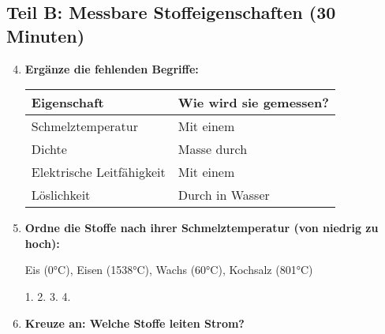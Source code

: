 \subsection*{Teil B: Messbare Stoffeigenschaften (30 Minuten)}

\begin{enumerate}[label=\arabic*.]
    \setcounter{enumi}{3}

    \item \textbf{Ergänze die fehlenden Begriffe:}
    \vspace{0.5cm}

    \begin{tabular}{|p{6cm}|p{8cm}|}
        \hline
        \textbf{Eigenschaft} & \textbf{Wie wird sie gemessen?} \\
        \hline
        Schmelztemperatur & Mit einem \underline{\hspace{3cm}} \\
        \hline
        Dichte & Masse durch \underline{\hspace{3cm}} \\
        \hline
        Elektrische Leitfähigkeit & Mit einem \underline{\hspace{3cm}} \\
        \hline
        Löslichkeit & Durch \underline{\hspace{3cm}} in Wasser \\
        \hline
    \end{tabular}

    \vspace{1cm}

    \item \textbf{Ordne die Stoffe nach ihrer Schmelztemperatur (von niedrig zu hoch):}
    \vspace{0.5cm}

    Eis (0°C), Eisen (1538°C), Wachs (60°C), Kochsalz (801°C)

    1. \underline{\hspace{3cm}} \hspace{1cm}
    2. \underline{\hspace{3cm}} \hspace{1cm}
    3. \underline{\hspace{3cm}} \hspace{1cm}
    4. \underline{\hspace{3cm}}

    \vspace{1cm}

    \item \textbf{Kreuze an: Welche Stoffe leiten Strom?}
    \vspace{0.5cm}


\end{enumerate}
